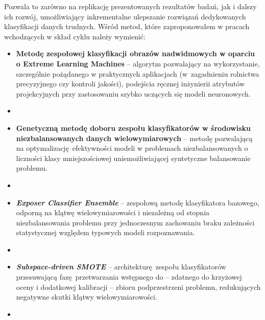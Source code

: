  Pozwala to zarówno na replikację prezentowanych rezultatów badań, jak i dalszy ich rozwój, umożliwiający inkrementalne ulepszanie rozwiązań dedykowanych klasyfikacji danych trudnych. 
 Wśród metod, które zaproponowałem w pracach wchodzących w skład cyklu należy wymienić:

\begin{itemize}
	\item \textbf{Metodę zespołowej klasyfikacji obrazów nadwidmowych w oparciu o Extreme Learning Machines} -- algorytm pozwalający na wykorzystanie, szczególnie pożądanego w praktycznych aplikacjach (w~zagadnieniu rolnictwa precyzyjnego czy kontroli jakości), podejścia ręcznej inżynierii atrybutów projekcyjnych przy zastosowaniu szybko uczących się modeli neuronowych.
	\item[]\vspace{-.5em} \emph{\color{red}\footnotesize{}}
	 
	\item \textbf{Genetyczną metodę doboru zespołu klasyfikatorów w środowisku niezbalansowanych danych wielowymiarowych} -- metodę pozwalającą na optymalizację efektywności modeli w problemach niezbalansowanych o liczności klasy mniejszościowej uniemożliwiającej syntetyczne balansowanie problemu.\\
	\item[]\vspace{-.5em} \emph{\color{red}\footnotesize{}}
	
	\item \textbf{\emph{Exposer Classifier Ensemble}} -- zespołową metodę klasyfikatora bazowego, odporną na klątwę wielowymiarowości i niezależną od stopnia niezbalansowania problemu przy jednoczesnym zachowaniu braku zależności statystycznej względem typowych modeli rozpoznawania. 
	\item[]\vspace{-.5em} \emph{\color{red}\footnotesize{}}
	
	\item \textbf{\emph{Subspace-driven SMOTE}} -- architekturę zespołu klasyfikatorów przesuwającą fazę przetwarzania wstępnego do -- zdatnego do krzyżowej oceny i dodatkowej kalibracji -- zbioru podprzestrzeni problemu, redukujących negatywne skutki klątwy wielowymiarowości. 
	\item[]\vspace{-.5em} \emph{\color{red}\footnotesize{}}
	

\end{itemize}
